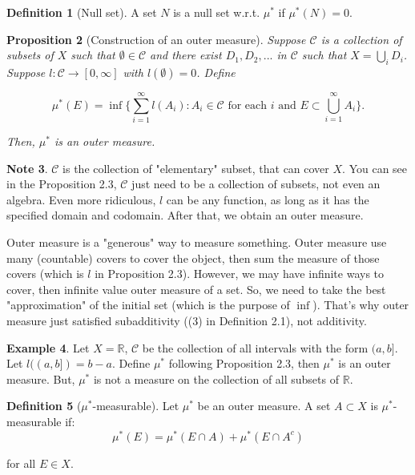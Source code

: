 \documentclass[11pt,a4paper]{article}
\theoremstyle{definition}
\newtheorem{definition}{Definition}[section]
\newtheorem{example}[definition]{Example}
\newtheorem{note}[definition]{Note}
\theoremstyle{plain}
\newtheorem{proposition}[definition]{Proposition}
\newcommand{\R}{\mathbb{R}}
\begin{document}
\begin{definition}[Null set]
A set $N$ is a null set w.r.t. $\mu^*$ if $\mu^*(N) = 0$.
\end{definition}

\begin{proposition}[Construction of an outer measure]
Suppose $\mathcal{C}$ is a collection of subsets of $X$ such that $\emptyset \in \mathcal{C}$ and there exist $D_1, D_2,...$ in $\mathcal{C}$ such that $X = \bigcup_iD_i$. Suppose $l: \mathcal{C}\rightarrow [0, \infty] $ with $l(\emptyset) = 0$. Define

\[
\mu^*(E) = \inf\{\sum_{i=1}^{\infty}l(A_i): A_i \in \mathcal{C} \text{ for each } i \text{ and } E\subset \bigcup_{i=1}^{\infty}A_i\}.
\]

Then, $\mu^*$ is an outer measure.
\end{proposition}

\begin{note}
$\mathcal{C}$ is the collection of "elementary" subset, that can cover $X$. You can see in the Proposition 2.3, $\mathcal{C}$ just need to be a collection of subsets, not even an algebra. Even more ridiculous, $l$ can be any function, as long as it has the specified domain and codomain. After that, we obtain an outer measure.
\end{note}


\begin{mynote}
Outer measure is a "generous" way to measure something. Outer measure use many (countable) covers to cover the object, then sum the measure of those covers (which is $l$ in Proposition 2.3). However, we may have infinite ways to cover, then infinite value outer measure of a set. So, we need to take the best "approximation" of the initial set (which is the purpose of $\inf$). That's why outer measure just satisfied subadditivity ((3) in Definition 2.1), not additivity.
\end{mynote}

\begin{example}
Let $X = \R$, $\mathcal{C}$ be the collection of all intervals with the form $(a, b]$. Let $l((a,b]) = b-a$. Define $\mu^*$ following Proposition 2.3, then $\mu^*$ is an outer measure. But, $\mu^*$ is not a measure on the collection of all subsets of $\R$.
\end{example}

\begin{definition}[$\mu^*$-measurable]
Let $\mu^*$ be an outer measure. A set $A \subset X$ is $\mu^*$-measurable if:
\[
\mu^*(E) = \mu^*(E \cap A) + \mu^*(E\cap A^c)
\]

for all $E \in X$.
\end{definition}
\end{document}
